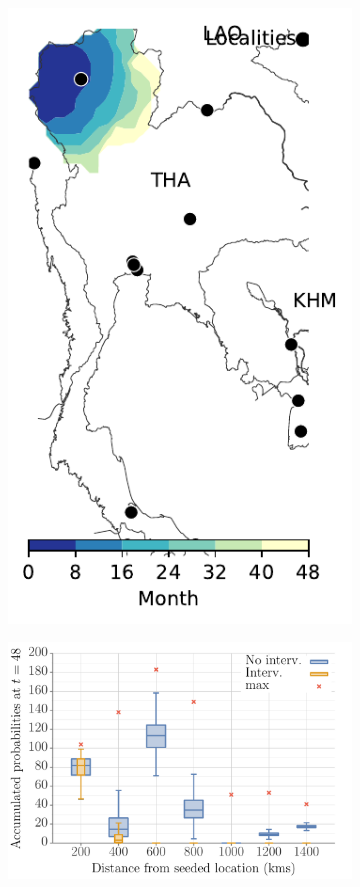 \documentclass[11pt]{article}
\theoremstyle{definition}
\begin{document}
\begin{figure}[ht]
\begin{subfigure}[b]{.135\textwidth}
    \includegraphics[width=\textwidth]{TH_model-B_precip1-out-100_m1_l3.pdf}
\caption{\label{fig:thlBContourInt}} %
\end{subfigure}
\begin{subfigure}[b]{.3\textwidth}
    \includegraphics[width=\textwidth]{TH_dist_prob_B_box.pdf}

\end{subfigure}
\end{figure}
\end{document}
